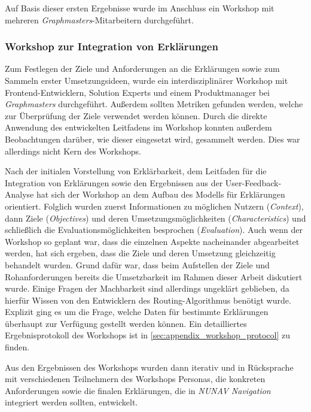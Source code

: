 \bigskip

Auf Basis dieser ersten Ergebnisse wurde im Anschluss ein Workshop mit mehreren \textit{Graphmasters}-Mitarbeitern durchgeführt.

\subsubsection{Workshop zur Integration von Erklärungen}

Zum Festlegen der Ziele und Anforderungen an die Erklärungen sowie zum Sammeln erster Umsetzungsideen, wurde ein interdisziplinärer Workshop mit Frontend-Entwicklern, \glqq Solution Experts\grqq{} und einem Produktmanager bei \textit{Graphmasters} durchgeführt. Außerdem sollten Metriken gefunden werden, welche zur Überprüfung der Ziele verwendet werden können. Durch die direkte Anwendung des entwickelten Leitfadens im Workshop konnten außerdem Beobachtungen darüber, wie dieser eingesetzt wird, gesammelt werden. Dies war allerdings nicht Kern des Workshops. 

Nach der initialen Vorstellung von Erklärbarkeit, dem Leitfaden für die Integration von Erklärungen sowie den Ergebnissen aus der User-Feedback-Analyse hat sich der Workshop an dem Aufbau des Modells für Erklärungen orientiert. Folglich wurden zuerst Informationen zu möglichen Nutzern (\textit{Context}), dann Ziele (\textit{Objectives}) und deren Umsetzungsmöglichkeiten (\textit{Characteristics}) und schließlich die Evaluationsmöglichkeiten besprochen (\textit{Evaluation}). Auch wenn der Workshop so geplant war, dass die einzelnen Aspekte nacheinander abgearbeitet werden, hat sich ergeben, dass die Ziele und deren Umsetzung gleichzeitig behandelt wurden. Grund dafür war, dass beim Aufstellen der Ziele und Rohanforderungen bereits die Umsetzbarkeit im Rahmen dieser Arbeit diskutiert wurde. Einige Fragen der Machbarkeit sind allerdings ungeklärt geblieben, da hierfür Wissen von den Entwicklern des Routing-Algorithmus benötigt wurde. Explizit ging es um die Frage, welche Daten für bestimmte Erklärungen überhaupt zur Verfügung gestellt werden können. Ein detailliertes Ergebnisprotokoll des Workshops ist in \autoref{sec:appendix_workshop_protocol} zu finden.

\newpage

Aus den Ergebnissen des Workshops wurden dann iterativ und in Rücksprache mit verschiedenen Teilnehmern des Workshops Personas, die konkreten Anforderungen sowie die finalen Erklärungen, die in \textit{NUNAV Navigation} integriert werden sollten, entwickelt.